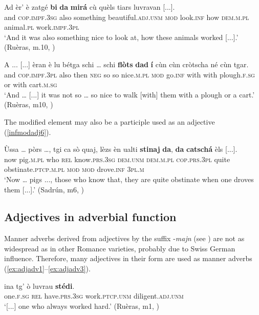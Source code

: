 \ea
\label{infmodadj4}
\gll   Ad èr' è zatgé \textbf{bi} \textbf{da} \textbf{mirá} cù quèls tiars luvravan [...]. \\
and \textsc{cop.impf.3sg} also something beautiful.\textsc{adj.unm} \textsc{mod} look.\textsc{inf} how \textsc{dem.m.pl} animal.\textsc{pl} work.\textsc{impf.3pl}\\
\glt `And it was also something nice to look at, how these animals worked [...].' (Ruèras, m.10,  )
\z

\ea
\label{infmodadj5}
\gll  A ... [...] èran è lu bétga schi … schi \textbf{flòts} \textbf{dad} \textbf{í} cùn cùn cròtscha né cùn tgar.\\
and {} {} \textsc{cop.impf.3pl} also then \textsc{neg} so {} so nice.\textsc{m.pl} \textsc{mod} go.\textsc{inf} with with plough.\textsc{f.sg} or with cart.\textsc{m.sg}\\
\glt `And … [...] it was not so … so nice to walk [with] them with a plough or a cart.' (Ruèras, m10, )
\z

The modified element may also be a participle used as an adjective (\ref{infmodadj6}).

\ea
\label{infmodadj6}
	\gll    Ùssa … pòrs …, tgi ca sò quaj, lèzs èn ualti \textbf{stinaj} \textbf{da}, \textbf{da} \textbf{catschá} èls [...].\\
now {} pig.\textsc{m.pl} {} who \textsc{rel}  know.\textsc{prs.3sg} \textsc{dem.unm} \textsc{dem.m.pl} \textsc{cop.prs.3pl} quite obstinate.\textsc{ptcp.m.pl} \textsc{mod} \textsc{mod} drove.\textsc{inf} \textsc{3pl.m}\\
\glt `Now … pigs ..., those who know that, they are quite obstinate when one droves them [...].' (Sadrún, m6, )
\z




\subsection{Adjectives in adverbial function}\label{sec:3.3.5}

Manner adverbs derived from adjectives by the suffix -\textit{majn} (see  ) are not as widespread as in other Romance varieties, probably due to Swiss German influence. Therefore, many adjectives in their  form are used as manner adverbs (\ref{ex:adjadv1}--\ref{ex:adjadv3}).

\ea\label{ex:adjadv1}
\gll [...] ina tg’ ò luvrau \textbf{stédi}.\\
{} one.\textsc{f.sg} \textsc{rel} have.\textsc{prs.3sg} work.\textsc{ptcp.unm} diligent.\textsc{adj.unm} \\
\glt `[...] one who always worked hard.' (Ruèras, m1,  )
\z

